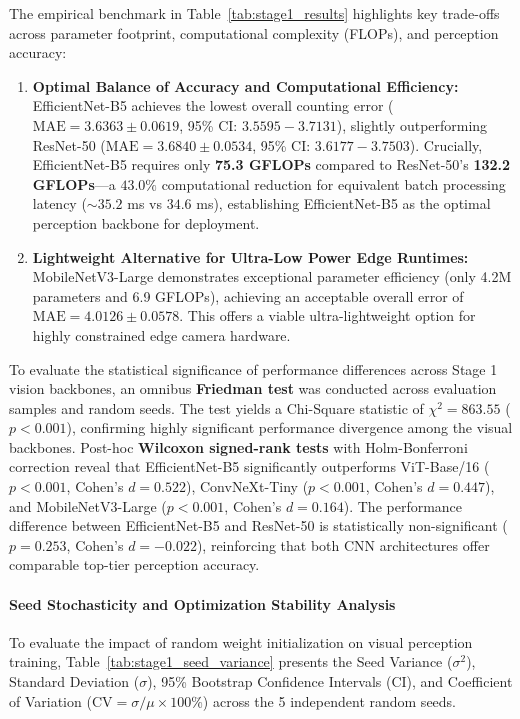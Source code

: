 \documentclass[a4paper,fleqn]{cas-sc}
\begin{document}
The empirical benchmark in Table~\ref{tab:stage1_results} highlights key trade-offs across parameter footprint, computational complexity (FLOPs), and perception accuracy:
\begin{enumerate}
    \item \textbf{Optimal Balance of Accuracy and Computational Efficiency:} EfficientNet-B5 achieves the lowest overall counting error ($\text{MAE} = 3.6363 \pm 0.0619$, 95\% CI: $3.5595 - 3.7131$), slightly outperforming ResNet-50 ($\text{MAE} = 3.6840 \pm 0.0534$, 95\% CI: $3.6177 - 3.7503$). Crucially, EfficientNet-B5 requires only \textbf{75.3 GFLOPs} compared to ResNet-50's \textbf{132.2 GFLOPs}—a $43.0\%$ computational reduction for equivalent batch processing latency ($\sim 35.2$ ms vs $34.6$ ms), establishing EfficientNet-B5 as the optimal perception backbone for deployment.
    \item \textbf{Lightweight Alternative for Ultra-Low Power Edge Runtimes:} MobileNetV3-Large demonstrates exceptional parameter efficiency (only 4.2M parameters and 6.9 GFLOPs), achieving an acceptable overall error of $\text{MAE} = 4.0126 \pm 0.0578$. This offers a viable ultra-lightweight option for highly constrained edge camera hardware.
\end{enumerate}

To evaluate the statistical significance of performance differences across Stage 1 vision backbones, an omnibus \textbf{Friedman test} was conducted across evaluation samples and random seeds. The test yields a Chi-Square statistic of $\chi^2 = 863.55$ ($p < 0.001$), confirming highly significant performance divergence among the visual backbones. Post-hoc \textbf{Wilcoxon signed-rank tests} with Holm-Bonferroni correction reveal that EfficientNet-B5 significantly outperforms ViT-Base/16 ($p < 0.001$, Cohen's $d = 0.522$), ConvNeXt-Tiny ($p < 0.001$, Cohen's $d = 0.447$), and MobileNetV3-Large ($p < 0.001$, Cohen's $d = 0.164$). The performance difference between EfficientNet-B5 and ResNet-50 is statistically non-significant ($p = 0.253$, Cohen's $d = -0.022$), reinforcing that both CNN architectures offer comparable top-tier perception accuracy.


\paragraph{Seed Stochasticity and Optimization Stability Analysis}
To evaluate the impact of random weight initialization on visual perception training, Table~\ref{tab:stage1_seed_variance} presents the Seed Variance ($\sigma^2$), Standard Deviation ($\sigma$), 95\% Bootstrap Confidence Intervals (CI), and Coefficient of Variation ($\text{CV} = \sigma / \mu \times 100\%$) across the 5 independent random seeds.
\end{document}
